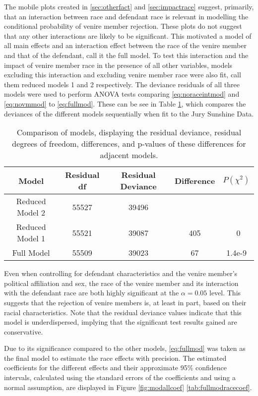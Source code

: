 The mobile plots created in \ref{sec:otherfact} and \ref{sec:impactrace} suggest, primarily, that an interaction between race and
defendant race is relevant in modelling the conditional probability of venire member rejection. These plots do not suggest that
any other interactions are likely to be significant. This motivated a model of all main effects and an interaction effect between the race of the venire member and that of the defendant, call it the full model. To test this interaction and the impact of venire member race in the presence of all other variables, models excluding this interaction and excluding venire member race were also fit, call them reduced models 1 and 2 respectively. The deviance residuals of all three models were used to perform ANOVA tests comparing \ref{eq:noraceintmod} and \ref{eq:novmmod} to \ref{eq:fullmod}. These can be see in Table \ref{tab:modcomp}, which compares the deviances of the different models sequentially when fit to the Jury Sunshine Data.

\begin{table}[h!]
  \centering
  \caption[Nested ANOVA Table Demonstrating the Importance of
  Race]{\footnotesize Comparison of models, displaying the residual deviance, residual degrees of freedom, differences, and p-values of these
    differences for adjacent models.}
  \label{tab:modcomp}
  \begin{tabular}{|c|c|c|c|c|} \hline
    Model & Residual df & Residual Deviance & Difference & $P(\chi^2)$ \\ \hline
    Reduced Model 2 & 55527 & 39496 &  &  \\
    Reduced Model 1 & 55521 & 39087 & 405 & ~0 \\
    Full Model & 55509 & 39023 & 67 & 1.4e-9 \\ \hline
  \end{tabular}
\end{table}

Even when controlling for defendant characteristics and the venire member's political affiliation and sex, the race of the venire
member and its interaction with the defendant race are both highly significant at the $\alpha = 0.05$ level. This suggests that
the rejection of venire members is, at least in part, based on their racial characteristics. Note that the residual deviance values indicate that this model
is underdispersed, implying that the significant test results gained
are conservative.

Due to its significance compared to the other models, \ref{eq:fullmod} was taken as the final model to estimate the race effects
with precision. The estimated coefficients for the different effects and their approximate 95\% confidence intervals, calculated
using the standard errors of the coefficients and using a normal assumption, are displayed in Figure \ref{fig:modallcoef}
\ref{tab:fullmodracecoef}.

